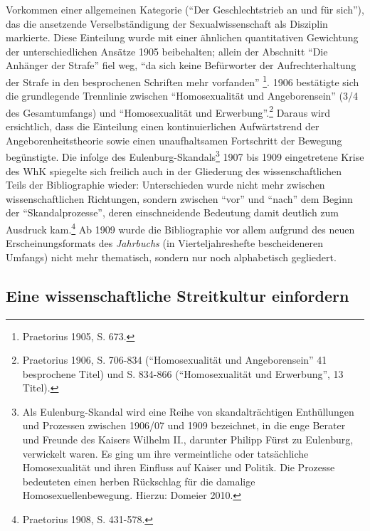 \documentclass[a4paper,
fontsize=11pt,
oneside,
numbers=noperiodatend,
parskip=half-,
bibliography=totoc,
final
]{scrartcl}
\begin{document}
Vorkommen einer allgemeinen Kategorie (\enquote{Der Geschlechtstrieb an
und für sich}), das die ansetzende Verselbständigung der
Sexualwissenschaft als Disziplin markierte. Diese Einteilung wurde mit
einer ähnlichen quantitativen Gewichtung der unterschiedlichen Ansätze
1905 beibehalten; allein der Abschnitt \enquote{Die Anhänger der Strafe}
fiel weg, \enquote{da sich keine Befürworter der Aufrechterhaltung der
Strafe in den besprochenen Schriften mehr vorfanden} \footnote{Praetorius
  1905, S. 673.}. 1906 bestätigte sich die grundlegende Trennlinie
zwischen \enquote{Homosexualität und Angeborensein} (3/4 des
Gesamtumfangs) und \enquote{Homosexualität und Erwerbung}.\footnote{Praetorius
  1906, S. 706-834 (\enquote{Homosexualität und Angeborensein} 41
  besprochene Titel) und S. 834-866 (\enquote{Homosexualität und
  Erwerbung}, 13 Titel).} Daraus wird ersichtlich, dass die Einteilung
einen kontinuierlichen Aufwärtstrend der Angeborenheitstheorie sowie
einen unaufhaltsamen Fortschritt der Bewegung begünstigte. Die infolge
des Eulenburg-Skandals\footnote{Als Eulenburg-Skandal wird eine Reihe
  von skandalträchtigen Enthüllungen und Prozessen zwischen 1906/07 und
  1909 bezeichnet, in die enge Berater und Freunde des Kaisers Wilhelm
  II., darunter Philipp Fürst zu Eulenburg, verwickelt waren. Es ging um
  ihre vermeintliche oder tatsächliche Homosexualität und ihren Einfluss
  auf Kaiser und Politik. Die Prozesse bedeuteten einen herben
  Rückschlag für die damalige Homosexuellenbewegung. Hierzu: Domeier
  2010.} 1907 bis 1909 eingetretene Krise des WhK spiegelte sich
freilich auch in der Gliederung des wissenschaftlichen Teils der
Bibliographie wieder: Unterschieden wurde nicht mehr zwischen
wissenschaftlichen Richtungen, sondern zwischen \enquote{vor} und
\enquote{nach} dem Beginn der \enquote{Skandalprozesse}, deren
einschneidende Bedeutung damit deutlich zum Ausdruck kam.\footnote{Praetorius
  1908, S. 431-578.} Ab 1909 wurde die Bibliographie vor allem aufgrund
des neuen Erscheinungsformats des \emph{Jahrbuchs} (in
Vierteljahreshefte bescheideneren Umfangs) nicht mehr thematisch,
sondern nur noch alphabetisch gegliedert.

\subsection*{Eine wissenschaftliche Streitkultur
einfordern}\label{eine-wissenschaftliche-streitkultur-einfordern}
\end{document}
